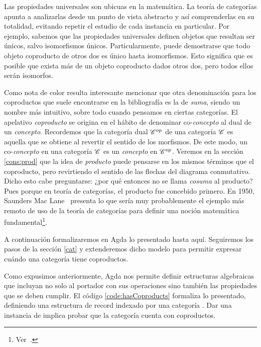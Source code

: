 Las propiedades universales son ubicuas en la matemática. La teoría de categorías apunta a analizarlas desde un punto de vista abstracto y así comprenderlas en su totalidad, evitando repetir el estudio de cada instancia en particular. Por ejemplo, sabemos que las propiedades universales definen objetos que resultan ser únicos, salvo isomorfismos únicos. Particularmente, puede demostrarse que todo objeto coproducto de otros dos es único hasta isomorfismos. Esto significa que es posible que exista más de un objeto coproducto dados otros dos, pero todos ellos serán isomorfos. 

\vspace{3ex}

Como nota de color resulta interesante mencionar que otra denominación para los coproductos que suele encontrarse en la bibliografía es la de {\it suma}, siendo un nombre más intuitivo, sobre todo cuando pensamos en ciertas categorías. El apelativo {\it coproducto} se origina en el hábito de denominar co-{\it concepto} al dual de un {\it concepto}. Recordemos que la categoría dual $\mathscr{C}^{op}$ de una categoría $\mathscr{C}$ es aquella que se obtiene al revertir el sentido de los morfismos. De este modo, un co-{\it concepto} en una categoría $\mathscr{C}$ es un {\it concepto} en $\mathscr{C}^{op}$. Veremos en la sección \ref{cons:prod} que la idea de {\it producto} puede pensarse en los mismos términos que el coproducto, pero revirtiendo el sentido de las flechas del diagrama conmutativo. Dicho esto cabe preguntarse: ¿por qué entonces no se llama {\it cosuma} al producto? Pues porque en teoría de categorías, el producto fue concebido primero. En 1950, Saunders Mac Lane~\cite{maclane1950} presenta lo que sería muy probablemente el ejemplo más remoto de uso de la teoría de categorías para definir una noción matemática fundamental\footnote{Ver~\cite{Awodey}.}. 

\vspace{3ex}

A continuación formalizaremos en Agda lo presentado hasta aquí. Seguiremos los pasos de la sección \ref{cat} y extenderemos dicho modelo para permitir expresar cuándo una categoría tiene coproductos.

Como expusimos anteriormente, Agda nos permite definir estructuras algebraicas que incluyan no solo al portador con sus operaciones sino también las propiedades que se deben cumplir.
El código \ref{code:hasCoproducts} formaliza lo presentado, definiendo una estructura de record indexado por una categoría \AgdaBound{\C}. Dar una instancia de  \AgdaBound{\C} implica probar que la categoría \AgdaBound{\C} cuenta con coproductos.

